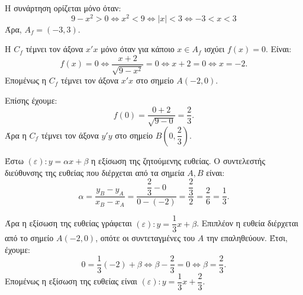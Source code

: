 
\begin{alist}
\item H συνάρτηση ορίζεται μόνο όταν:
\[9 - x^2 > 0 \Leftrightarrow x^2 < 9 \Leftrightarrow |x| < 3 \Leftrightarrow -3 < x < 3\]
Άρα, $A_f = (-3, 3)$.

\item Η $C_f$ τέμνει τον άξονα $x'x$ μόνο όταν για κάποιο $x \in A_f$ ισχύει $f(x) = 0$. Είναι:
\[f(x) = 0 \Leftrightarrow \dfrac{x + 2}{\sqrt{9 - x^2}} = 0 \Leftrightarrow x + 2 = 0 \Leftrightarrow x = -2.\]
Επομένως η $C_f$ τέμνει τον άξονα $x'x$ στο σημείο $A(-2, 0)$.

Επίσης έχουμε:
\[f(0) = \dfrac{0 + 2}{\sqrt{9 - 0}} = \dfrac{2}{3}.\]
Άρα η $C_f$ τέμνει τον άξονα $y'y$ στο σημείο $B\left(0, \dfrac{2}{3}\right)$.

\item Έστω $(\varepsilon): y = \alpha x + \beta$ η εξίσωση της ζητούμενης ευθείας. Ο συντελεστής διεύθυνσης της ευθείας που διέρχεται από τα σημεία $A, B$ είναι:
\[\alpha = \dfrac{y_B - y_A}{x_B - x_A} = \dfrac{\dfrac{2}{3} - 0}{0 - (-2)} = \dfrac{\dfrac{2}{3}}{2} = \dfrac{2}{6} = \dfrac{1}{3}.\]

Άρα η εξίσωση της ευθείας γράφεται
$(\varepsilon): y = \dfrac{1}{3}x + \beta$.
Επιπλέον η ευθεία διέρχεται από το σημείο $A(-2, 0)$, οπότε οι συντεταγμένες του $A$ την επαληθεύουν. Έτσι, έχουμε:
\[0 = \dfrac{1}{3}(-2) + \beta \Leftrightarrow \beta - \dfrac{2}{3} = 0 \Leftrightarrow \beta = \dfrac{2}{3}.\]
Επομένως η εξίσωση της ευθείας είναι $(\varepsilon): y = \dfrac{1}{3}x + \dfrac{2}{3}$.
\end{alist}

